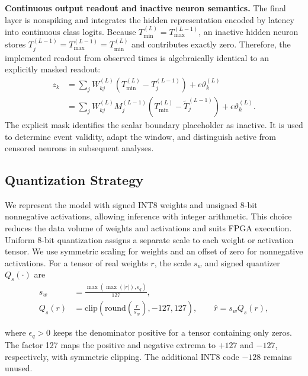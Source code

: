 ﻿\documentclass[12pt]{article}
\begin{document}
\textbf{Continuous output readout and inactive neuron semantics.}
The final layer is nonspiking and integrates the hidden representation encoded by latency into continuous class logits. Because $T_{\min}^{(L)}=T_{\max}^{(L-1)}$, an inactive hidden neuron stores $T_j^{(L-1)}=T_{\max}^{(L-1)}=T_{\min}^{(L)}$ and contributes exactly zero. Therefore, the implemented readout from observed times is algebraically identical to an explicitly masked readout:
\begin{equation}
\begin{aligned}
z_k
&=\sum_j W_{kj}^{(L)}\!\left(T_{\min}^{(L)}-T_j^{(L-1)}\right)+\epsilon\vartheta_k^{(L)}\\
&=\sum_j W_{kj}^{(L)}M_j^{(L-1)}\!\left(T_{\min}^{(L)}-\tilde{T}_j^{(L-1)}\right)+\epsilon\vartheta_k^{(L)}.
\end{aligned}
\label{eq:masked_logit}
\end{equation}
The explicit mask identifies the scalar boundary placeholder as inactive. It is used to determine event validity, adapt the window, and distinguish active from censored neurons in subsequent analyses.

\subsection{Quantization Strategy}
We represent the model with signed INT8 weights and unsigned 8-bit nonnegative activations, allowing inference with integer arithmetic. This choice reduces the data volume of weights and activations and suits FPGA execution. Uniform 8-bit quantization assigns a separate scale to each weight or activation tensor. We use symmetric scaling for weights and an offset of zero for nonnegative activations. For a tensor of real weights $r$, the scale $s_w$ and signed quantizer $Q_s(\cdot)$ are
\begin{equation}
\begin{aligned}
s_w &= \frac{\max\!\left(\max(|r|),\epsilon_q\right)}{127},\\
Q_s(r) &= \mathrm{clip}\!\left(\mathrm{round}\!\left(\frac{r}{s_w}\right),-127,127\right),
\qquad \hat{r}=s_w Q_s(r),
\end{aligned}
\label{eq:quant_w}
\end{equation}

where $\epsilon_q>0$ keeps the denominator positive for a tensor containing only zeros. The factor 127 maps the positive and negative extrema to $+127$ and $-127$, respectively, with symmetric clipping. The additional INT8 code $-128$ remains unused.
\end{document}
